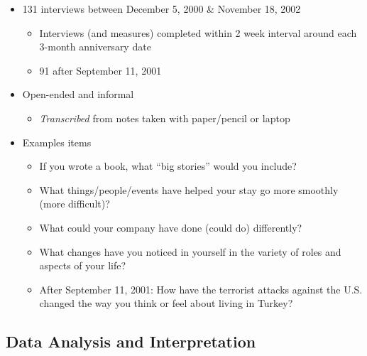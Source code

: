 \documentclass[
  english,
]{book}
\providecommand{\tightlist}{%
  \setlength{\itemsep}{0pt}\setlength{\parskip}{0pt}}
\begin{document}
\begin{itemize}
\tightlist
\item
  131 interviews between December 5, 2000 \& November 18, 2002

  \begin{itemize}
  \tightlist
  \item
    Interviews (and measures) completed within 2 week interval around each 3-month anniversary date
  \item
    91 after September 11, 2001
  \end{itemize}
\item
  Open-ended and informal

  \begin{itemize}
  \tightlist
  \item
    \emph{Transcribed} from notes taken with paper/pencil or laptop
  \end{itemize}
\item
  Examples items

  \begin{itemize}
  \tightlist
  \item
    If you wrote a book, what ``big stories'' would you include?
  \item
    What things/people/events have helped your stay go more smoothly (more difficult)?
  \item
    What could your company have done (could do) differently?
  \item
    What changes have you noticed in yourself in the variety of roles and aspects of your life?
  \item
    After September 11, 2001: How have the terrorist attacks against the U.S. changed the way you think or feel about living in Turkey?
  \end{itemize}
\end{itemize}

\hypertarget{data-analysis-and-interpretation}{%
\subsection{Data Analysis and Interpretation}\label{data-analysis-and-interpretation}}
\end{document}
